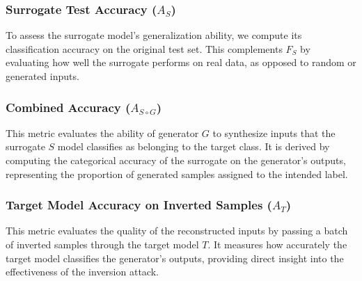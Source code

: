 \subsubsection{Surrogate Test Accuracy (\(A_S\))} To assess the surrogate model’s generalization ability, we compute its classification accuracy on the original test set. This complements \(F_S\) by evaluating how well the surrogate performs on real data, as opposed to random or generated inputs.

\subsubsection{Combined Accuracy (\(A_{S \circ G}\))}
This metric evaluates the ability of generator \(G\)  to synthesize inputs that the surrogate \(S\) model classifies as belonging to the target class. It is derived by computing the categorical accuracy of the surrogate on the generator’s outputs, representing the proportion of generated samples assigned to the intended label.

\subsubsection{Target Model Accuracy on Inverted Samples (\(A_T\))} This metric evaluates the quality of the reconstructed inputs by passing a batch of inverted samples through the target model \(T\). It measures how accurately the target model classifies the generator’s outputs, providing direct insight into the effectiveness of the inversion attack.














